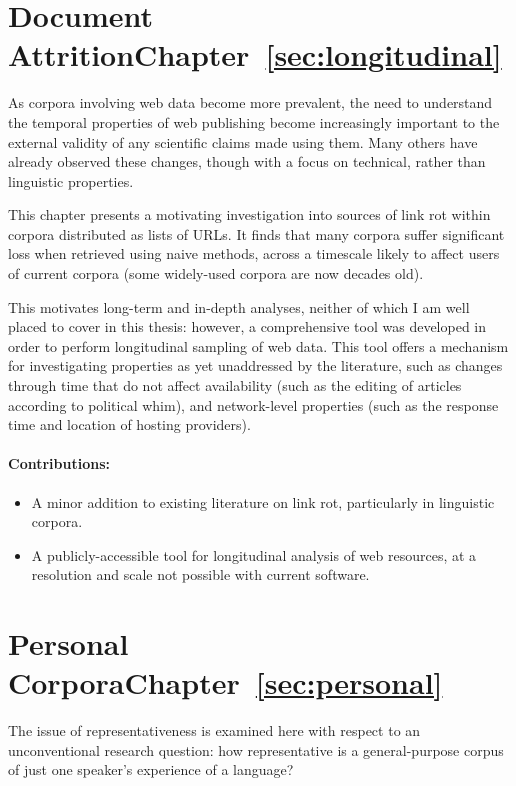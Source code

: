 \section*{Document Attrition\hfill{}Chapter~\ref{sec:longitudinal}}
As corpora involving web data become more prevalent, the need to understand the temporal properties of web publishing become increasingly important to the external validity of any scientific claims made using them.  Many others have already observed these changes, though with a focus on technical, rather than linguistic properties.

This chapter presents a motivating investigation into sources of link rot within corpora distributed as lists of URLs.  It finds that many corpora suffer significant loss when retrieved using naive methods, across a timescale likely to affect users of current corpora (some widely-used corpora are now decades old).

This motivates long-term and in-depth analyses, neither of which I am well placed to cover in this thesis: however, a comprehensive tool was developed in order to perform longitudinal sampling of web data.  This tool offers a mechanism for investigating properties as yet unaddressed by the literature, such as changes through time that do not affect availability (such as the editing of articles according to political whim), and network-level properties (such as the response time and location of hosting providers).

\paragraph{Contributions:}
\begin{itemize}
    \item A minor addition to existing literature on link rot, particularly in linguistic corpora.
    \item A publicly-accessible tool for longitudinal analysis of web resources, at a resolution and scale not possible with current software.
\end{itemize}

\section*{Personal Corpora\hfill{}Chapter~\ref{sec:personal}}
The issue of representativeness is examined here with respect to an unconventional research question: how representative is a general-purpose corpus of just one speaker's experience of a language?

